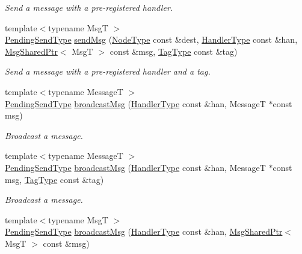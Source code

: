 \begin{DoxyCompactItemize}
\begin{DoxyCompactList}\small\item\em Send a message with a pre-\/registered handler. \end{DoxyCompactList}\item 
{\footnotesize template$<$typename MsgT $>$ }\\\hyperlink{structvt_1_1messaging_1_1_active_messenger_a3626a6ca76d8ad4ec7c3b47a2c70d3a8}{Pending\+Send\+Type} \hyperlink{group__preregister_ga26272a5a0f43d34981433cfbe63a5f5e}{send\+Msg} (\hyperlink{namespacevt_a866da9d0efc19c0a1ce79e9e492f47e2}{Node\+Type} const \&dest, \hyperlink{namespacevt_af64846b57dfcaf104da3ef6967917573}{Handler\+Type} const \&han, \hyperlink{structvt_1_1messaging_1_1_msg_shared_ptr}{Msg\+Shared\+Ptr}$<$ MsgT $>$ const \&msg, \hyperlink{namespacevt_a84ab281dae04a52a4b243d6bf62d0e52}{Tag\+Type} const \&tag)
\begin{DoxyCompactList}\small\item\em Send a message with a pre-\/registered handler and a tag. \end{DoxyCompactList}\item 
{\footnotesize template$<$typename MessageT $>$ }\\\hyperlink{structvt_1_1messaging_1_1_active_messenger_a3626a6ca76d8ad4ec7c3b47a2c70d3a8}{Pending\+Send\+Type} \hyperlink{group__preregister_gad206aeeb8c0ffe4af72fb758c83a7b78}{broadcast\+Msg} (\hyperlink{namespacevt_af64846b57dfcaf104da3ef6967917573}{Handler\+Type} const \&han, MessageT $\ast$const msg)
\begin{DoxyCompactList}\small\item\em Broadcast a message. \end{DoxyCompactList}\item 
{\footnotesize template$<$typename MessageT $>$ }\\\hyperlink{structvt_1_1messaging_1_1_active_messenger_a3626a6ca76d8ad4ec7c3b47a2c70d3a8}{Pending\+Send\+Type} \hyperlink{group__preregister_gae6b4f2036fb32acb6a62fc77954ca06f}{broadcast\+Msg} (\hyperlink{namespacevt_af64846b57dfcaf104da3ef6967917573}{Handler\+Type} const \&han, MessageT $\ast$const msg, \hyperlink{namespacevt_a84ab281dae04a52a4b243d6bf62d0e52}{Tag\+Type} const \&tag)
\begin{DoxyCompactList}\small\item\em Broadcast a message. \end{DoxyCompactList}\item 
{\footnotesize template$<$typename MsgT $>$ }\\\hyperlink{structvt_1_1messaging_1_1_active_messenger_a3626a6ca76d8ad4ec7c3b47a2c70d3a8}{Pending\+Send\+Type} \hyperlink{group__preregister_gae5a1d5306f276d9a3db69c84ef089a88}{broadcast\+Msg} (\hyperlink{namespacevt_af64846b57dfcaf104da3ef6967917573}{Handler\+Type} const \&han, \hyperlink{structvt_1_1messaging_1_1_msg_shared_ptr}{Msg\+Shared\+Ptr}$<$ MsgT $>$ const \&msg)

\end{DoxyCompactItemize}
